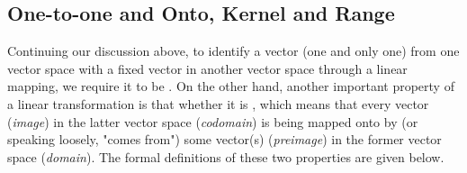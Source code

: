 \subsection{One-to-one and Onto, Kernel and Range}

Continuing our discussion above, to identify a vector (one and only one) from one vector space with a fixed vector in another vector space through a linear mapping, we require it to be . On the other hand, another important property of a linear transformation is that whether it is , which means that every vector (\textit{image}) in the latter vector space (\textit{codomain}) is being mapped onto by (or speaking loosely, "comes from") some vector(s) (\textit{preimage}) in the former vector space (\textit{domain}). The formal definitions of these two properties are given below.

